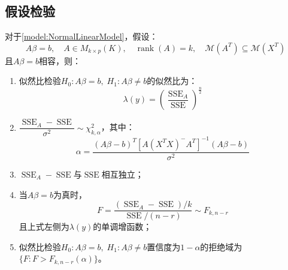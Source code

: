 \subsection{假设检验}
\begin{theorem}\label{theo:NormalLinearModelHypothesisTesting}
	对于\cref{model:NormalLinearModel}，假设：
	\begin{equation*}
		A\beta=b,\quad A\in M_{k\times p}(K),\quad\operatorname{rank}(A)=k,\quad\mathcal{M}(A^T)\subseteq\mathcal{M}(X^T)
	\end{equation*}
	且$A\beta=b$相容，则：
	\begin{enumerate}
		\item 似然比检验$H_0:A\beta=b,\;H_1:A\beta\ne b$的似然比为：
		\begin{equation*}
			\lambda(y)=\left(\frac{\operatorname{SSE}_A}{\operatorname{SSE}}\right)^\frac{n}{2}
		\end{equation*}
		\item $\dfrac{\operatorname{SSE}_A-\operatorname{SSE}}{\sigma^2}\sim\chi^2_{k,\alpha}$，其中：
		\begin{equation*}
			\alpha=\frac{(A\beta-b)^T[A(X^TX)^-A^T]^{-1}(A\beta-b)}{\sigma^2}
		\end{equation*}
		\item $\operatorname{SSE}_A-\operatorname{SSE}$与$\operatorname{SSE}$相互独立；
		\item 当$A\beta=b$为真时，
		\begin{equation*}
			F=\frac{(\operatorname{SSE}_A-\operatorname{SSE})/k}{\operatorname{SSE}/(n-r)}\sim F_{k,n-r}
		\end{equation*}
		且上式左侧为$\lambda(y)$的单调增函数；
		\item 似然比检验$H_0:A\beta=b,\;H_1:A\beta\ne b$置信度为$1-\alpha$的拒绝域为$\{F:F>F_{k,n-r}(\alpha)\}$。
	\end{enumerate}
\end{theorem}
